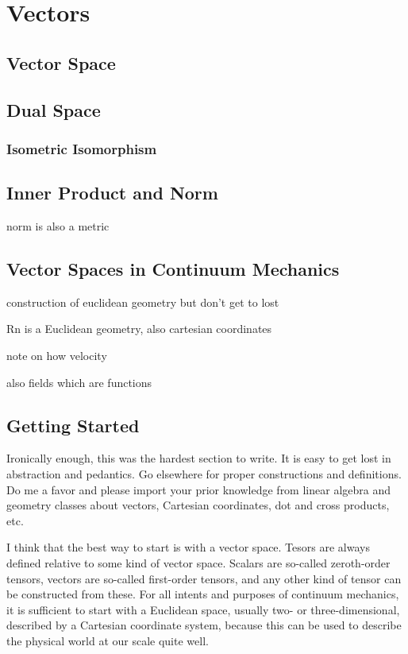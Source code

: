 \chapter{Vectors}
\label{chapter:Vectors}


\section{Vector Space}

\section{Dual Space}

\subsection{Isometric Isomorphism}

\section{Inner Product and Norm}

norm is also a metric

\section{Vector Spaces in Continuum Mechanics}

construction of euclidean geometry but don't get to lost

Rn is a Euclidean geometry, also cartesian coordinates

note on how velocity

also fields which are functions

\section{Getting Started}

Ironically enough, this was the hardest section to write. It is easy to get lost in abstraction and pedantics. Go elsewhere for proper constructions and definitions. Do me a favor and please import your prior knowledge from linear algebra and geometry classes about vectors, Cartesian coordinates, dot and cross products, etc.

I think that the best way to start is with a vector space. Tesors are always defined relative to some kind of vector space. Scalars are so-called zeroth-order tensors, vectors are so-called first-order tensors, and any other kind of tensor can be constructed from these. For all intents and purposes of continuum mechanics, it is sufficient to start with a Euclidean space, usually two- or three-dimensional, described by a Cartesian coordinate system, because this can be used to describe the physical world at our scale quite well.

